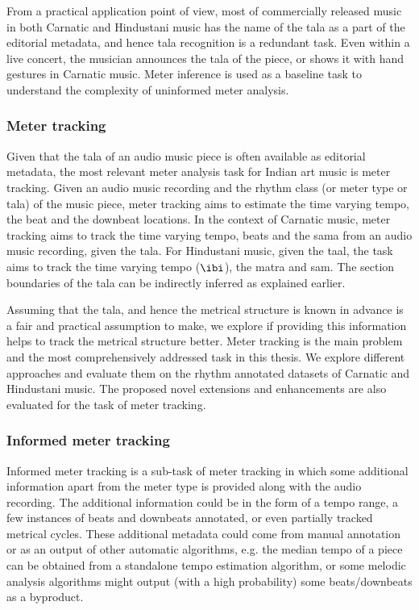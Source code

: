From a practical application point of view, most of commercially released music in both Carnatic and Hindustani music has the name of the \gls{tala} as a part of the editorial metadata, and hence \gls{tala} recognition is a redundant task. Even within a live concert, the musician announces the \gls{tala} of the piece, or shows it with hand gestures in Carnatic music. Meter inference is used as a baseline task to understand the complexity of uninformed meter analysis. 
\subsubsection{Meter tracking}
Given that the \gls{tala} of an audio music piece is often available as editorial metadata, the most relevant meter analysis task for Indian art music is meter tracking. Given an audio music recording and the rhythm class (or meter type or \gls{tala}) of the music piece, meter tracking aims to estimate the time varying tempo, the beat and the downbeat locations. In the context of Carnatic music, meter tracking aims to track the time varying tempo, beats and the \gls{sama} from an audio music recording, given the \gls{tala}. For Hindustani music, given the \gls{taal}, the task aims to track the time varying tempo ($\ibi$), the \gls{matra} and \gls{sam}. The section boundaries of the \gls{tala} can be indirectly inferred as explained earlier. 

Assuming that the \gls{tala}, and hence the metrical structure is known in advance is a fair and practical assumption to make, we explore if providing this information helps to track the metrical structure better. Meter tracking is the main problem and the most comprehensively addressed task in this thesis. We explore different approaches and evaluate them on the rhythm annotated datasets of Carnatic and Hindustani music. The proposed novel extensions and enhancements are also evaluated for the task of meter tracking. 
\subsubsection{Informed meter tracking}
Informed meter tracking is a sub-task of meter tracking in which some additional information apart from the meter type is provided along with the audio recording. The additional information could be in the form of a tempo range, a few instances of beats and downbeats annotated, or even partially tracked metrical cycles. These additional metadata could come from manual annotation or as an output of other automatic algorithms, e.g. the median tempo of a piece can be obtained from a standalone tempo estimation algorithm, or some melodic analysis algorithms might output (with a high probability) some beats/downbeats as a byproduct. 

